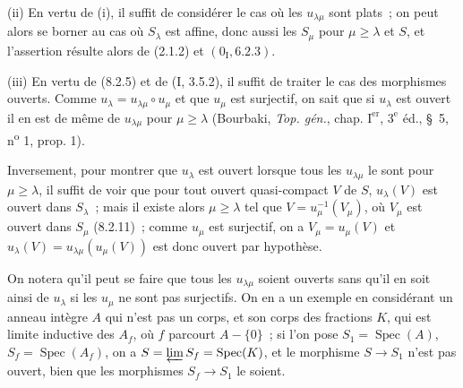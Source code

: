 \medskip
\noindent
(ii) En vertu de (i), il suffit de considérer le cas où les
$u_{\lambda\mu}$ sont plats~; on peut alors se borner au cas où $S_\lambda$
est affine, donc aussi les $S_\mu$ pour $\mu\geq\lambda$ et $S$, et
l'assertion résulte alors de (2.1.2) et $(0_{\mathrm I},6.2.3)$.

\medskip
\noindent
(iii) En vertu de (8.2.5) et de (I, 3.5.2), il suffit de traiter le cas des
morphismes ouverts. Comme $u_\lambda=u_{\lambda\mu}\circ u_\mu$ et que
$u_\mu$ est surjectif, on sait que si $u_\lambda$ est ouvert il en est de
même de $u_{\lambda\mu}$ pour $\mu\geq\lambda$ (Bourbaki,
\emph{Top. gén.}, chap. $\mathrm I^{\mathrm{er}}$, $3^{\mathrm e}$ éd.,
\S~5, n\textsuperscript{o} 1, prop. 1).

Inversement, pour montrer que $u_\lambda$ est ouvert lorsque tous les
$u_{\lambda\mu}$ le sont pour $\mu\geq\lambda$, il suffit de voir que pour
tout ouvert quasi-compact $V$ de $S$, $u_\lambda(V)$ est ouvert dans
$S_\lambda$~; mais il existe alors $\mu\geq\lambda$ tel que
$V=u_\mu^{-1}(V_\mu)$, où $V_\mu$ est ouvert dans $S_\mu$ (8.2.11)~; comme
$u_\mu$ est surjectif, on a $V_\mu=u_\mu(V)$ et
$u_\lambda(V)=u_{\lambda\mu}(u_\mu(V))$ est donc ouvert par hypothèse.

On notera qu'il peut se faire que tous les $u_{\lambda\mu}$ soient ouverts
sans qu'il en soit ainsi de $u_\lambda$ si les $u_\mu$ ne sont pas
surjectifs. On en a un exemple en considérant un anneau intègre $A$ qui n'est
pas un corps, et son corps des fractions $K$, qui est limite inductive des
$A_f$, où $f$ parcourt $A-\{0\}$~; si l'on pose
$S_1=\operatorname{Spec}(A)$, $S_f=\operatorname{Spec}(A_f)$, on a
$S=\varprojlim S_f=\operatorname{Spec}(K)$, et le morphisme $S\to S_1$ n'est
pas ouvert, bien que les morphismes $S_f\to S_1$ le soient.

